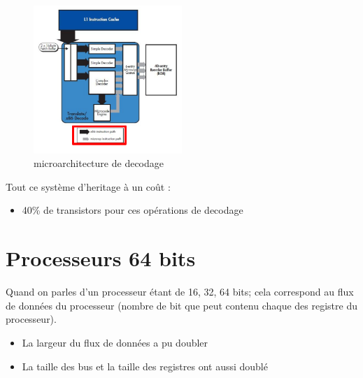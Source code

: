 \documentclass[a4paper]{article}
\begin{document}
  \begin{figure}[H]
    \centering
    \includegraphics[width = 0.5\textwidth]{images/14.PNG}
    \caption{microarchitecture de decodage}
  \end{figure}

  Tout ce système d'heritage à un coût :\\
  \begin{itemize}
    \item 40\% de transistors pour ces opérations de decodage
  \end{itemize}























  \section{Processeurs 64 bits}
  
  Quand on parles d'un processeur étant de 16, 32, 64 bits; cela correspond au flux de données du processeur (nombre de bit que peut contenu chaque des registre du processeur).
  \begin{itemize}
    \item La largeur du flux de données a pu doubler
    \item La taille des bus et la taille des registres ont aussi doublé
  \end{itemize}
\end{document}
